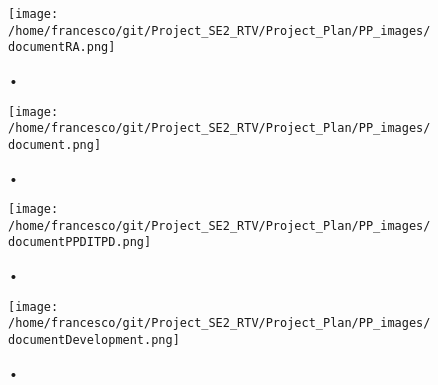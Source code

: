 \documentclass[10pt, a4paper,titlepage]{article}
\begin{document}
\begin{figure}[h]
\begin{center}
\texttt{[image: /home/francesco/git/Project\_SE2\_RTV/Project\_Plan/PP\_images/documentRA.png]}
\label{fig:SCED}
\end{center}•
\end{figure}
\begin{figure}[h]
\begin{center}
\texttt{[image: /home/francesco/git/Project\_SE2\_RTV/Project\_Plan/PP\_images/document.png]}
\label{fig:SCED}
\end{center}•
\end{figure}
\begin{figure}[h]
\begin{center}
\texttt{[image: /home/francesco/git/Project\_SE2\_RTV/Project\_Plan/PP\_images/documentPPDITPD.png]}
\label{fig:SCED}
\end{center}•
\end{figure}
\begin{figure}[h]
\begin{center}
\texttt{[image: /home/francesco/git/Project\_SE2\_RTV/Project\_Plan/PP\_images/documentDevelopment.png]}
\label{fig:SCED}
\end{center}•
\end{figure}
\end{document}
